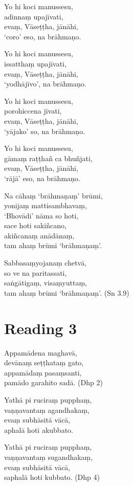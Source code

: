 Yo hi koci manussesu,\\
adinnaṃ upajīvati,\\
evaṃ, Vāseṭṭha, jānāhi,\\
‘coro’ eso, na brāhmaṇo.

Yo hi koci manussesu,\\
issatthaṃ upajīvati,\\
evaṃ, Vāseṭṭha, jānāhi,\\
‘yodhājīvo’, na brāhmaṇo.

Yo hi koci manussesu,\\
porohiccena jīvati,\\
evaṃ, Vāseṭṭha, jānāhi,\\
‘yājako’ so, na brāhmaṇo.

Yo hi koci manussesu,\\
gāmaṃ raṭṭhañ ca bhuñjati,\\
evaṃ, Vāseṭṭha, jānāhi,\\
‘rājā’ eso, na brāhmaṇo.

Na cāhaṃ ‘brāhmaṇaṃ’ brūmi,\\
yonijaṃ mattisambhavaṃ,\\
‘Bhovādi’ nāma so hoti,\\
sace hoti sakiñcano,\\
akiñcanaṃ anādānaṃ,\\
tam ahaṃ brūmi ‘brāhmaṇaṃ’.

Sabbasaṃyojanaṃ chetvā,\\
so ve na paritassati,\\
saṅgātigaṃ, visaṃyuttaṃ,\\
tam ahaṃ brūmi ‘brāhmaṇaṃ’. \hfill(Sn 3.9)

\section*{Reading 3}

Appamādena maghavā,\\
devānaṃ seṭṭhataṃ gato,\\
appamādaṃ pasaṃsanti,\\
pamādo garahito sadā. \hfill(Dhp 2)

Yathā pi ruciraṃ pupphaṃ,\\
vaṇṇavantaṃ agandhakaṃ,\\
evaṃ subhāsitā vācā,\\
aphalā hoti akubbato.

Yathā pi ruciraṃ pupphaṃ,\\
vaṇṇavantaṃ sugandhakaṃ,\\
evaṃ subhāsitā vācā,\\
saphalā hoti kubbato. \hfill(Dhp 4)


